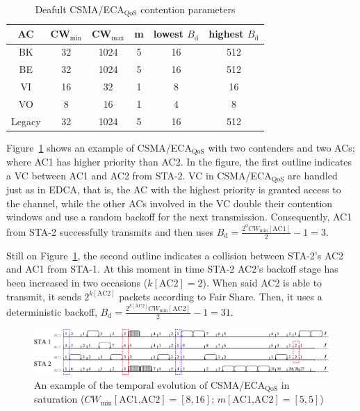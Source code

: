 	\begin{table}
		\centering
		\caption{Deafult CSMA/ECA$_{\text{QoS}}$ contention parameters}
		\label{tab:ecaQosParams}
		\begin{tabular}{|c|c|c|c|c|c|}
			\hline
			{\bfseries AC} & {\bfseries CW$_{\min}$} & {\bfseries CW$_{\max}$} & {\bfseries m} & {\bfseries lowest $B_{\text{d}}$} & {\bfseries highest $B_{\text{d}}$}\\
			\hline
			BK		       &	32				&		1024		  & 		5	&			16		        &		512\\
			BE		       &	32				&		1024		  &		5	&			16		        &		512\\
			VI		       &	16				&		32			  & 		1	&			8		        &		16\\
			VO		       &	8				&		16			  & 		1	&			4		        &		8\\
			Legacy	       &	32				&		1024		  & 		5	&			16		        &		512\\
			\hline
		\end{tabular}
	\end{table}

Figure~\ref{fig:ecaQoS} shows an example of CSMA/ECA$_{\text{QoS}}$ with two contenders and two ACs; where AC1 has higher priority than AC2. In the figure, the first outline indicates a VC between AC1 and AC2 from STA-2. VC in CSMA/ECA$_{\text{QoS}}$ are handled just as in EDCA, that is, the AC with the highest priority is granted access to the channel, while the other ACs involved in the VC double their contention windows and use a random backoff for the next transmission. Consequently, AC1 from STA-2 successfully transmits and then uses $B_{\text{d}}=\frac{2^{0}CW_{\min}[\text{AC1}]}{2}-1= 3$.

Still on Figure~\ref{fig:ecaQoS}, the second outline indicates a collision between STA-2's AC2 and AC1 from STA-1. At this moment in time STA-2 AC2's backoff stage has been increased in two occasions ($k[\text{AC2}]=2$). When said AC2 is able to transmit, it sends $2^{k[\text{AC2}]}$ packets according to Fair Share. Then, it uses a deterministic backoff, $B_{\text{d}}=\frac{2^{k[\text{AC2}]}CW_{\min}[\text{AC2}]}{2}-1=31$.

	\begin{figure}[tb]
	\centering
		\includegraphics[width=0.9\linewidth]{figures/csma-eca-hew-oldScheme-fixed.eps}
		\caption{An example of the temporal evolution of CSMA/ECA$_{\text{QoS}}$ in saturation ($CW_{\min}[\text{AC1,AC2}]=[8,16]$; $m[\text{AC1,AC2}]=[5,5]$)}
		\label{fig:ecaQoS}
	\end{figure}

